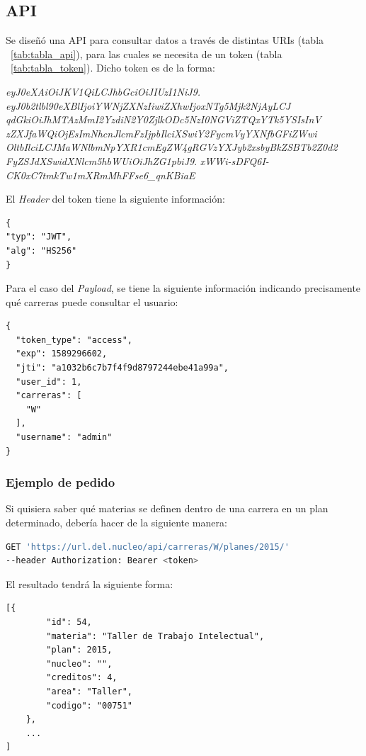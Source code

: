 \subsection{API}

Se diseñó una API para consultar datos a través de distintas URIs (tabla ~\ref{tab:tabla_api}), para las cuales se necesita de un token (tabla ~\ref{tab:tabla_token}).
Dicho token es de la forma:

\textit{eyJ0eXAiOiJKV1QiLCJhbGciOiJIUzI1NiJ9.} \break 
\textit{eyJ0b2tlbl90eXBlIjoiYWNjZXNzIiwiZXhwIjoxNTg5Mjk2NjAyLCJ}\break 
\textit{qdGkiOiJhMTAzMmI2YzdiN2Y0ZjlkODc5NzI0NGViZTQxYTk5YSIsInV}\break 
\textit{zZXJfaWQiOjEsImNhcnJlcmFzIjpbIlciXSwiY2FycmVyYXNfbGFiZWwi} \break \textit{OltbIlciLCJMaWNlbmNpYXR1cmEgZW4gRGVzYXJyb2xsbyBkZSBTb2Z0d2}\break 
\textit{FyZSJdXSwidXNlcm5hbWUiOiJhZG1pbiJ9}.\break 
\textit{xWWi-sDFQ6I-CK0xC7tmkTw1mXRmMhFFse6\_qnKBiaE}

\break
El \textit{Header} del token tiene la siguiente información:
\begin{verbatim}
{
"typ": "JWT",
"alg": "HS256"
}
\end{verbatim}
\break
Para el caso del \textit{Payload}, se tiene la siguiente información indicando precisamente qué carreras puede consultar el usuario:
\begin{verbatim}
{
  "token_type": "access",
  "exp": 1589296602,
  "jti": "a1032b6c7b7f4f9d8797244ebe41a99a",
  "user_id": 1,
  "carreras": [
    "W"
  ],
  "username": "admin"
}
\end{verbatim}

\subsubsection{Ejemplo de pedido}
Si quisiera saber qué materias se definen dentro de una carrera en un plan determinado, debería hacer de la siguiente manera:

\begin{lstlisting}[language=bash]
GET 'https://url.del.nucleo/api/carreras/W/planes/2015/'
--header Authorization: Bearer <token>
\end{lstlisting}

El resultado tendrá la siguiente forma:

\begin{verbatim}
[{
        "id": 54,
        "materia": "Taller de Trabajo Intelectual",
        "plan": 2015,
        "nucleo": "",
        "creditos": 4,
        "area": "Taller",
        "codigo": "00751"
    },
    ...
]
\end{verbatim}

